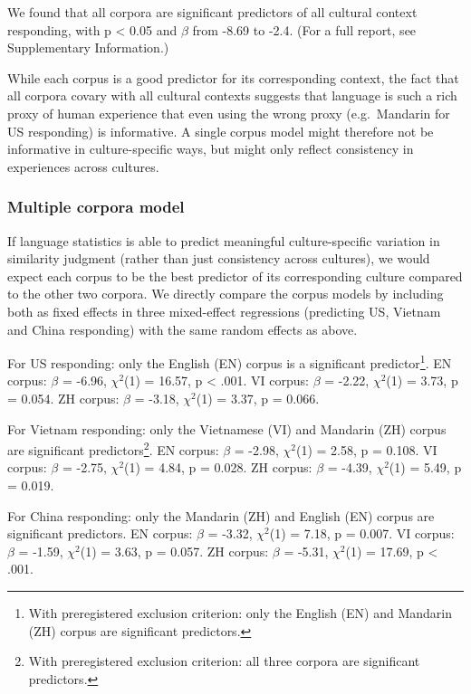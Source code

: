 \documentclass[10pt, letterpaper]{article}
\begin{document}
We found that all corpora are significant predictors of all cultural
context responding, with p \textless{} 0.05 and \(\beta\) from -8.69 to
-2.4. (For a full report, see Supplementary Information.)

While each corpus is a good predictor for its corresponding context, the
fact that all corpora covary with all cultural contexts suggests that
language is such a rich proxy of human experience that even using the
wrong proxy (e.g.~Mandarin for US responding) is informative. A single
corpus model might therefore not be informative in culture-specific
ways, but might only reflect consistency in experiences across cultures.

\hypertarget{multiple-corpora-model}{%
\subsubsection{Multiple corpora model}\label{multiple-corpora-model}}

If language statistics is able to predict meaningful culture-specific
variation in similarity judgment (rather than just consistency across
cultures), we would expect each corpus to be the best predictor of its
corresponding culture compared to the other two corpora. We directly
compare the corpus models by including both as fixed effects in three
mixed-effect regressions (predicting US, Vietnam and China responding)
with the same random effects as above.

For US responding: only the English (EN) corpus is a significant
predictor\footnote{With preregistered exclusion criterion: only the
  English (EN) and Mandarin (ZH) corpus are significant predictors.}. EN
corpus: \(\beta\) = -6.96, \(\chi^2\)(1) = 16.57, p \textless{} .001. VI
corpus: \(\beta\) = -2.22, \(\chi^2\)(1) = 3.73, p = 0.054. ZH corpus:
\(\beta\) = -3.18, \(\chi^2\)(1) = 3.37, p = 0.066.

For Vietnam responding: only the Vietnamese (VI) and Mandarin (ZH)
corpus are significant predictors\footnote{With preregistered exclusion
  criterion: all three corpora are significant predictors.}. EN corpus:
\(\beta\) = -2.98, \(\chi^2\)(1) = 2.58, p = 0.108. VI corpus: \(\beta\)
= -2.75, \(\chi^2\)(1) = 4.84, p = 0.028. ZH corpus: \(\beta\) = -4.39,
\(\chi^2\)(1) = 5.49, p = 0.019.

For China responding: only the Mandarin (ZH) and English (EN) corpus are
significant predictors. EN corpus: \(\beta\) = -3.32, \(\chi^2\)(1) =
7.18, p = 0.007. VI corpus: \(\beta\) = -1.59, \(\chi^2\)(1) = 3.63, p =
0.057. ZH corpus: \(\beta\) = -5.31, \(\chi^2\)(1) = 17.69, p
\textless{} .001.
\end{document}
